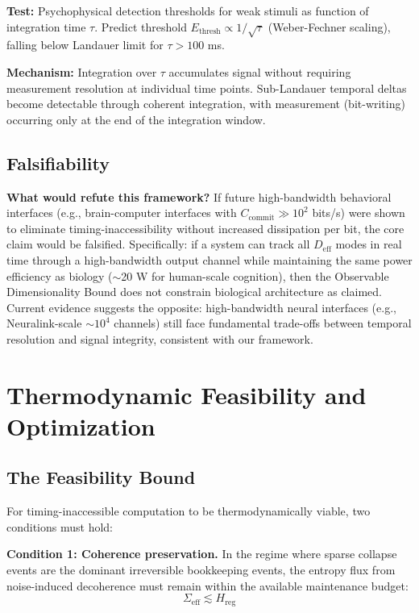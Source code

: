 \documentclass[12pt]{article}
\begin{document}
\textbf{Test:} Psychophysical detection thresholds for weak stimuli as function of integration time $\tau$. Predict threshold $E_{\text{thresh}} \propto 1/\sqrt{\tau}$ (Weber-Fechner scaling), falling below Landauer limit for $\tau > 100$ ms.

\textbf{Mechanism:} Integration over $\tau$ accumulates signal without requiring measurement resolution at individual time points. Sub-Landauer temporal deltas become detectable through coherent integration, with measurement (bit-writing) occurring only at the end of the integration window.

\subsection{Falsifiability}

\textbf{What would refute this framework?} If future high-bandwidth behavioral interfaces (e.g., brain-computer interfaces with $C_{\text{commit}} \gg 10^2$ bits/s) were shown to eliminate timing-inaccessibility without increased dissipation per bit, the core claim would be falsified. Specifically: if a system can track all $D_{\text{eff}}$ modes in real time through a high-bandwidth output channel while maintaining the same power efficiency as biology ($\sim$20 W for human-scale cognition), then the Observable Dimensionality Bound does not constrain biological architecture as claimed. Current evidence suggests the opposite: high-bandwidth neural interfaces (e.g., Neuralink-scale $\sim 10^4$ channels) still face fundamental trade-offs between temporal resolution and signal integrity, consistent with our framework.

\section{Thermodynamic Feasibility and Optimization}

\subsection{The Feasibility Bound}

For timing-inaccessible computation to be thermodynamically viable, two conditions must hold:

\textbf{Condition 1: Coherence preservation.} In the regime where sparse collapse events are the dominant irreversible bookkeeping events, the entropy flux from noise-induced decoherence must remain within the available maintenance budget:
\begin{equation}
\Sigma_{\text{eff}} \lesssim H_{\text{reg}}
\end{equation}
\end{document}
